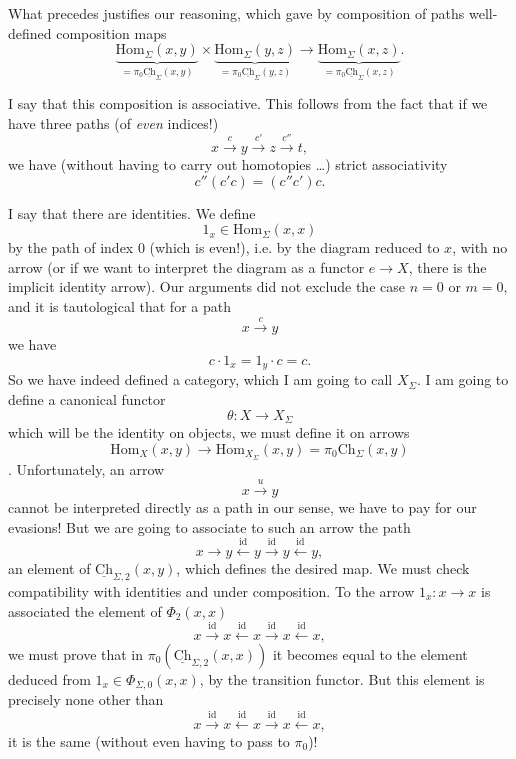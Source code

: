 \documentclass[11pt]{article}
\newcommand{\printedpage}[1]{\marginpar{\footnotesize p.~#1}}
\newcommand{\msp}[1]{\marginpar{\footnotesize [#1]}}
\newcommand{\uCh}{\underline{\mathrm{Ch}}}
\newcommand{\Hom}{\mathrm{Hom}}
\begin{document}
\printedpage{14}
What precedes justifies our reasoning, which gave by composition of paths well-defined composition maps
\[
\underbrace{\Hom_\Sigma(x,y)}_{=\pi_0\uCh_\Sigma(x,y)} \times \underbrace{\Hom_\Sigma(y,z)}_{=\pi_0\uCh_\Sigma(y,z)} \longrightarrow \underbrace{\Hom_\Sigma(x,z)}_{=\pi_0\underline{\textstyle\mathrm{Ch}}_\Sigma(x,z)}.
\]

\msp{page 22}I say that this composition is associative. This follows from the fact that if we have three paths (of \textit{even} indices!)
\[
x \xrightarrow{c} y \xrightarrow{c'} z \xrightarrow{c''} t,
\]
we have (without having to carry out homotopies \dots) strict associativity
\[
c''(c'c) = (c''c')c.
\]

I say that there are identities. We define
\[
1_x \in \Hom_\Sigma(x,x)
\]
by the path of index 0 (which is even!), i.e. by the diagram reduced to $x$, with no arrow (or if we want to interpret the diagram as a functor $e \longrightarrow X$, there is the implicit identity arrow). Our arguments did not exclude the case $n = 0$ or $m = 0$, and it is tautological that for a path
\[
x \xrightarrow{c} y
\]
we have
\[
c \cdot 1_x = 1_y \cdot c = c.
\]
So we have indeed defined a category, which I am going to call $X_\Sigma$. I am going to define a canonical functor %
\[
\theta : X \longrightarrow X_\Sigma
\]
which will be the identity on objects, we must define it on arrows
\[
\Hom_X(x,y) \longrightarrow \Hom_{X_\Sigma}(x,y) = \pi_0\mathrm{Ch}_\Sigma(x,y)
\]
. Unfortunately, an arrow
\[
x \xrightarrow{u} y
\]
\msp{page 23}cannot be interpreted directly as a path in our sense, we have to pay for our evasions! But we are going to associate to such an arrow the path
\[
x \longrightarrow y \xleftarrow{\mathrm{id}} y \xrightarrow{\mathrm{id}} y \xleftarrow{\mathrm{id}} y,
\]
\printedpage{15}
an element of $\uCh_{\Sigma,2}(x,y)$, which defines the desired map. We must check compatibility with identities and under composition. To the arrow $1_x : x \longrightarrow x$ is associated the element of $\Phi_2(x,x)$
\[
x \xrightarrow{\mathrm{id}} x \xleftarrow{\mathrm{id}} x \xrightarrow{\mathrm{id}} x \xleftarrow{\mathrm{id}} x,
\]
we must prove that in $\pi_0(\uCh_{\Sigma,2}(x,x))$ it becomes equal to the element deduced from $1_x \in \Phi_{\Sigma,0}(x,x)$, by the transition functor. But this element is precisely none other than
\[
x \xrightarrow{\mathrm{id}} x \xleftarrow{\mathrm{id}} x \xrightarrow{\mathrm{id}} x \xleftarrow{\mathrm{id}} x,
\]
it is the same (without even having to pass to $\pi_0$)!
\end{document}
